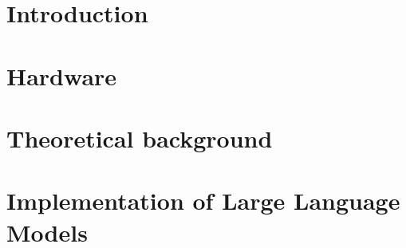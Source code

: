 {}
{}


\tableofcontents                %




\mainmatter                     %


\part{Introduction}




\part{Hardware}





\part{Theoretical background} %
%


%

\part{Implementation of Large Language Models}





